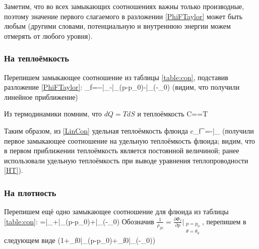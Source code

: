 \documentclass[main.tex]{subfiles}
\begin{document}
Заметим, что во всех замыкающих соотношениях важны только производные, поэтому значение первого слагаемого в разложении \eqref{PhiFTaylor} может быть любым (другими словами, потенциальную и внутреннюю энергии можем отмерять от любого уровня).

\subsubsection{На теплоёмкость}
Перепишем замыкающее соотношение из таблицы \ref{table:con}, подставив разложение \ref{PhiFTaylor}:
\beq\label{LinCon}
\eta_f=-\approx -\bigg|_{}-\bigg|_{}\left(p-p_0\right)-\bigg|_{}\left(\theta-\theta_0\right)
\eeq
(видим, что получили линейное приближение)

Из термодинамики помним, что $dQ=TdS$ и теплоёмкость
\beq
C==T
\eeq

Таким образом, из \eqref{LinCon} удельная теплоёмкость флюида
\beq\label{CF}
c_f^\theta=\theta{}\approx-\theta{}\bigg|_{}
\eeq
(получили первое замыкающее соотношение на удельную теплоёмкость флюида; видим, что в первом приближении теплоёмкость является постоянной величиной; ранее использовали удельную теплоёмкость при выводе уравнения теплопроводности \eqref{HT}).

\subsubsection{На плотность}
Перепишем ещё одно замыкающее соотношение для флюида из таблицы \ref{table:con}:
\beq
{}=\approx{}\bigg|_{}+\bigg|_{}\left(p-p_0\right)+\bigg|_{}\left(\theta-\theta_0\right)
\eeq
Обозначив $\displaystyle{}\frac{1}{\rho_{f0}}=\frac{\partial\Phi_f}{\partial p}\bigg|_{\substack{p=p_0\\ \theta=\theta_0}}$, перепишем в следующем виде
\beq\label{RhoF}
\approx{}\left(1+\rho_{f0}\bigg|_{}\left(p-p_0\right)+\rho_{f0}\bigg|_{}\left(\theta-\theta_0\right)\right)
\eeq
\end{document}
